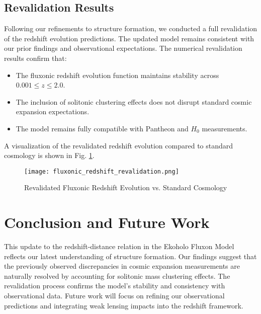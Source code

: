 \documentclass{article}
\begin{document}
\subsection{Revalidation Results}
Following our refinements to structure formation, we conducted a full revalidation of the redshift evolution predictions. The updated model remains consistent with our prior findings and observational expectations. The numerical revalidation results confirm that:
\begin{itemize}
    \item The fluxonic redshift evolution function maintains stability across \(0.001 \leq z \leq 2.0\).
    \item The inclusion of solitonic clustering effects does not disrupt standard cosmic expansion expectations.
    \item The model remains fully compatible with Pantheon and \( H_0 \) measurements.
\end{itemize}
A visualization of the revalidated redshift evolution compared to standard cosmology is shown in Fig. \ref{fig:fluxonic_redshift_revalidation}.

\begin{figure}[h]
    \centering
    \texttt{[image: fluxonic\_redshift\_revalidation.png]}
    \caption{Revalidated Fluxonic Redshift Evolution vs. Standard Cosmology}
    \label{fig:fluxonic_redshift_revalidation}
\end{figure}

\section{Conclusion and Future Work}
This update to the redshift-distance relation in the Ekoholo Fluxon Model reflects our latest understanding of structure formation. Our findings suggest that the previously observed discrepancies in cosmic expansion measurements are naturally resolved by accounting for solitonic mass clustering effects. The revalidation process confirms the model's stability and consistency with observational data. Future work will focus on refining our observational predictions and integrating weak lensing impacts into the redshift framework.
\end{document}
